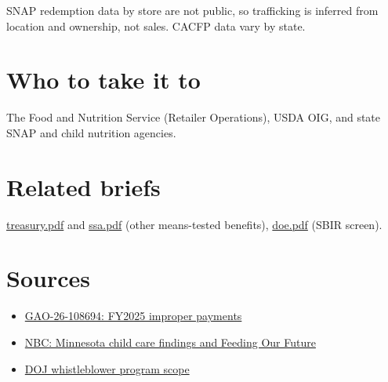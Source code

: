 \documentclass[letterpaper,11pt]{article}
\providecommand{\tightlist}{\setlength{\itemsep}{0pt}\setlength{\parskip}{0pt}}
\begin{document}
SNAP redemption data by store are not public, so trafficking is inferred
from location and ownership, not sales. CACFP data vary by state.

\hypertarget{who-to-take-it-to}{%
\section{Who to take it to}\label{who-to-take-it-to}}

The Food and Nutrition Service (Retailer Operations), USDA OIG, and
state SNAP and child nutrition agencies.

\hypertarget{related-briefs}{%
\section{Related briefs}\label{related-briefs}}

\url{treasury.pdf} and \url{ssa.pdf} (other means-tested benefits),
\url{doe.pdf} (SBIR screen).

\hypertarget{sources}{%
\section{Sources}\label{sources}}

\begin{itemize}
\tightlist
\item
  \href{https://www.gao.gov/products/gao-26-108694}{GAO-26-108694:
  FY2025 improper payments}
\item
  \href{https://www.nbcwashington.com/news/national-international/minnesota-department-finds-child-care-centers-targeted-viral-video-open/4036664/}{NBC:
  Minnesota child care findings and Feeding Our Future}
\item
  \href{https://www.justice.gov/fraud/whistleblower}{DOJ whistleblower
  program scope}
\end{itemize}
\end{document}
